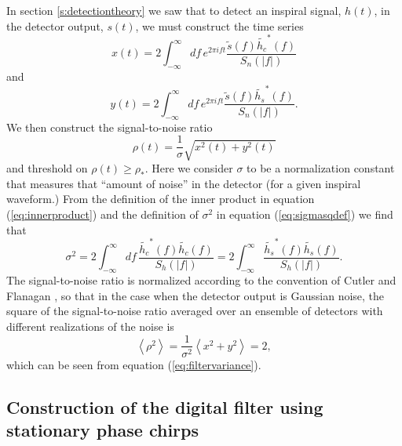 In section \ref{s:detectiontheory} we saw that to detect an inspiral signal,
$h(t)$, in the detector output, $s(t)$, we must construct the time series
\begin{equation}
\label{eq:xcts}
x(t) = 2 \int_{-\infty}^{\infty}df\,e^{2\pi i f t} 
\frac{\tilde{s}(f) \tilde{h_c}^\ast(f)}{S_n\left(\left|f\right|\right)}
\end{equation}
and
\begin{equation}
\label{eq:ycts}
y(t) = 2 \int_{-\infty}^{\infty}df\,e^{2\pi i f t} 
\frac{\tilde{s}(f) \tilde{h_s}^\ast(f)}{S_n\left(\left|f\right|\right)}.
\end{equation}
We then construct the signal-to-noise ratio
\begin{equation}
\rho(t) = \frac{1}{\sigma}\sqrt{x^2(t) + y^2(t)}
\label{eq:rhosqcts}
\end{equation}
and threshold on $\rho(t) \ge \rho_\ast$. Here we consider $\sigma$ to be a
normalization constant that measures that ``amount of noise'' in the detector
(for a given inspiral waveform.) From the definition of the inner product in
equation (\ref{eq:innerproduct}) and the definition of $\sigma^2$ in equation
(\ref{eq:sigmasqdef}) we find that
\begin{equation}
\label{eq:sigmasqcts}
\sigma^2 = 2 \int_{-\infty}^{\infty}df\,
\frac{\tilde{h_c}^\ast(f)\tilde{h_c}(f)}{S_h\left(\left|f\right|\right)} 
= 2 \int_{-\infty}^\infty 
\frac{\tilde{h_s}^\ast(f)\tilde{h_s}(f)}{S_h\left(\left|f\right|\right)}.
\end{equation}
The signal-to-noise ratio is normalized according to the convention
of Cutler and Flanagan \cite{Cutler:1994}, so that in the case when the detector
output is Gaussian noise, the square of the signal-to-noise ratio averaged
over an ensemble of detectors with different realizations of the noise is
\begin{equation}
\left\langle \rho^2 \right\rangle = 
\frac{1}{\sigma^2} \left\langle x^2 + y^2 \right\rangle = 2,
\end{equation}
which can be seen from equation (\ref{eq:filtervariance}).

\subsection{Construction of the digital filter using stationary phase chirps}
\label{ss:digitalfilter}

